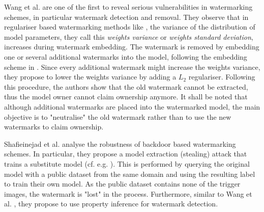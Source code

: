 Wang et al. \cite{wang_attacks_2019} are one of the first to reveal serious vulnerabilities in watermarking schemes, in particular watermark detection and removal. They observe that in regulariser based watermarking methods like \cite{uchida_embedding_2017}, the variance of the distribution of model parameters, they call this \textit{weights variance} or \textit{weights standard deviation}, increases during watermark embedding.
The watermark is removed by embedding one or several additional watermarks into the model, following the embedding scheme in \cite{uchida_embedding_2017}. Since every additional watermark might increase the weights variance, they propose to lower the weights variance by adding a $L_2$ regulariser. Following this procedure, the authors show that the old watermark cannot be extracted, thus the model owner cannot claim ownership anymore. It shall be noted that although additional watermarks are placed into the watermarked model, the main objective is to "neutralise" the old watermark rather than to use the new watermarks to claim ownership.


Shafieinejad et al. \cite{shafieinejad_robustness_2019} analyse the robustness of backdoor based watermarking schemes. In particular, they propose a model extraction (stealing) attack that trains a substitute model (cf. e.g. \cite{papernot_practical_2017}).
This is performed by querying the original model with a public dataset from the same domain and using the resulting label to train their own model. As the public dataset contains none of the trigger images, the watermark is "lost" in the process.
Furthermore, similar to Wang et al. \cite{wang_robust_2020}, they propose to use property inference for watermark detection.

